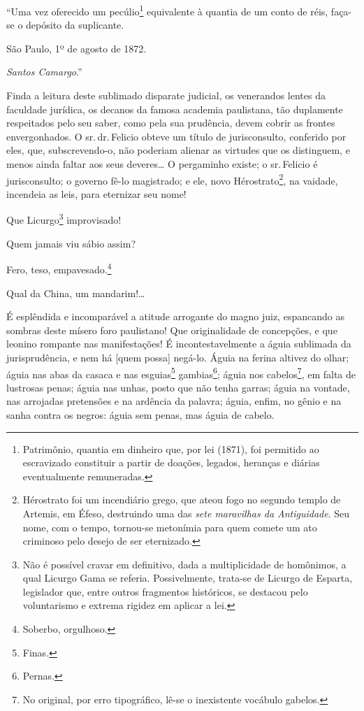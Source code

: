``Uma vez oferecido um pecúlio\footnote{ Patrimônio, quantia em dinheiro
  que, por lei (1871), foi permitido ao escravizado constituir a partir
  de doações, legados, heranças e diárias eventualmente remuneradas.}
equivalente à quantia de um conto de réis, faça-se o depósito da
suplicante.

São Paulo, 1º de agosto de 1872.

\emph{Santos Camargo}.''

Finda a leitura deste sublimado disparate judicial, os venerandos lentes
da faculdade jurídica, os decanos da famosa academia paulistana, tão
duplamente respeitados pelo seu saber, como pela sua prudência, devem
cobrir as frontes envergonhados. O sr.\,dr.\,Felicio obteve um título de
jurisconsulto, conferido por eles, que, subscrevendo-o, não poderiam
alienar as virtudes que os distinguem, e menos ainda faltar aos seus
deveres\ldots{} O pergaminho existe; o sr.\,Felicio é jurisconsulto; o governo
fê-lo magistrado; e ele, novo Hérostrato\footnote{ Hérostrato foi um
  incendiário grego, que ateou fogo no segundo templo de Artemis, em
  Éfeso, destruindo uma das \emph{sete maravilhas da Antiguidade}. Seu
  nome, com o tempo, tornou-se metonímia para quem comete um ato
  criminoso pelo desejo de ser eternizado.}, na vaidade, incendeia as
leis, para eternizar seu nome!

Que Licurgo\footnote{ Não é possível cravar em definitivo, dada a
  multiplicidade de homônimos, a qual Licurgo Gama se referia.
  Possivelmente, trata-se de Licurgo de Esparta, legislador que, entre
  outros fragmentos históricos, se destacou pelo voluntarismo e extrema
  rigidez em aplicar a lei.} improvisado!

Quem jamais viu sábio assim?

Fero, teso, empavesado.\footnote{ Soberbo, orgulhoso.}

Qual da China, um mandarim!\ldots{}

É esplêndida e incomparável a atitude arrogante do magno juiz,
espancando as sombras deste mísero foro paulistano! Que originalidade de
concepções, e que leonino rompante nas manifestações! É
incontestavelmente a águia sublimada da jurisprudência, e nem há {[}quem
possa{]} negá-lo. Águia na ferina altivez do olhar; águia nas abas da
casaca e nas esguias\footnote{ Finas.} gambias\footnote{ Pernas.};
águia nos cabelos\footnote{ No original, por erro tipográfico, lê-se o
  inexistente vocábulo gabelos.}, em falta de lustrosas penas; águia nas
unhas, posto que não tenha garras; águia na vontade, nas arrojadas
pretensões e na ardência da palavra; águia, enfim, no gênio e na sanha
contra os negros: águia sem penas, mas águia de cabelo.

